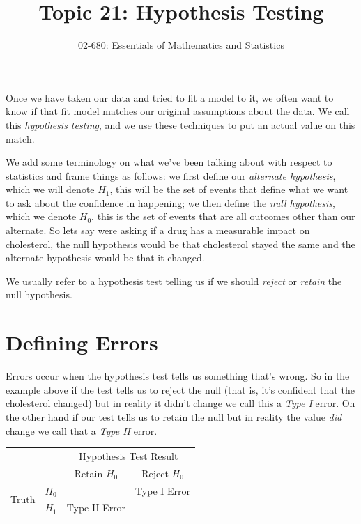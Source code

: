

\title{Topic 21: Hypothesis Testing}
\author{02-680: Essentials of Mathematics and Statistics}


\maketitle

Once we have taken our data and tried to fit a model to it, 
we often want to know if that fit model matches our original assumptions about the data. 
We call this \emph{hypothesis testing}, 
and we use these techniques to put an actual value on this match. 

We add some terminology on what we've been talking about with respect to statistics 
and frame things as follows: 
we first define our \emph{alternate hypothesis}, which we will denote $H_1$, 
this will be the set of events that define what we want to ask about the confidence in happening; 
we then define the \emph{null hypothesis}, which we denote $H_0$, 
this is the set of events that are all outcomes other than our alternate. 
So lets say were asking if a drug has a measurable impact on cholesterol, 
the null hypothesis would be that cholesterol stayed the same 
and the alternate hypothesis would be that it changed. 

We usually refer to a hypothesis test telling us if we should \emph{reject} or \emph{retain} the null hypothesis. 

\section{Defining Errors}
Errors occur when the hypothesis test tells us something that's wrong. 
So in the example above 
if the test tells us to reject the null (that is, it's confident that the cholesterol changed) 
but in reality it didn't change we call this a \emph{Type I} error. 
On the other hand if our test tells us to retain the null but in reality the value \textit{did} change 
we call that a \emph{Type II} error. 

\begin{center}
\begin{tabular}{|cc||c|c|}
\hline
&& \multicolumn{2}{c|}{Hypothesis Test Result}\\
&& Retain $H_0$ & Reject $H_0$\\
\hline \hline
\multirow{2}{*}{Truth} & $H_0$ & & Type I Error\\
\cline{2-4}
& $H_1$ & Type II Error & \\
\hline
\end{tabular}
\end{center}

